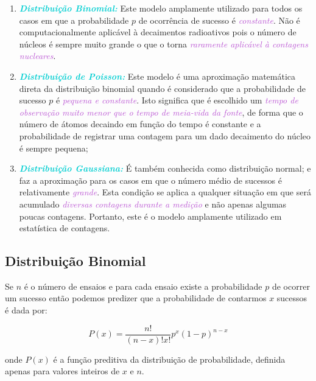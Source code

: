 \documentclass[11pt,a4paper]{article}
\begin{document}
	\begin{enumerate}
		\item \textit{\textbf{\textcolor{DarkTurquoise}{Distribuição Binomial:}}} Este modelo amplamente utilizado para todos os casos em que a probabilidade $p$ de ocorrência de sucesso é \textcolor{MediumOrchid}{\textit{constante}}. Não é computacionalmente aplicável à decaimentos radioativos pois o número de núcleos é sempre muito grande o que o torna \textcolor{MediumOrchid}{\textit{raramente aplicável à contagens nucleares}}.
		
		\item \textit{\textbf{\textcolor{DarkTurquoise}{Distribuição de Poisson:}}} Este modelo é uma aproximação matemática direta da distribuição binomial quando é considerado que a probabilidade de sucesso $p$ é \textcolor{MediumOrchid}{\textit{pequena e constante}}. Isto significa que é escolhido um \textcolor{MediumOrchid}{\textit{tempo de observação muito menor que o tempo de meia-vida da fonte}}, de forma que o número de átomos decaindo em função do tempo é constante e a probabilidade de registrar uma contagem para um dado decaimento do núcleo é sempre pequena;
		
		\item \textit{\textbf{\textcolor{DarkTurquoise}{Distribuição Gaussiana:}}} É também conhecida como distribuição normal; e faz a aproximação para os casos em que o número médio de sucessos é relativamente \textcolor{MediumOrchid}{\textit{grande}}. Esta condição se aplica a qualquer situação em que será acumulado \textcolor{MediumOrchid}{\textit{diversas contagens durante a medição}} e não apenas algumas poucas contagens. Portanto, este é o modelo amplamente utilizado em estatística de contagens.		
	\end{enumerate}

	\subsection*{Distribuição Binomial}

		Se $n$ é o número de ensaios e para cada ensaio existe a probabilidade $p$ de ocorrer um sucesso então podemos predizer que a probabilidade de contarmos $x$ sucessos é dada por:

			\begin{equation}
				P(x) = \frac{n!}{(n - x)! x!} p^x (1 - p)^{n - x}
			\end{equation}

		\noindent onde $P(x)$ é a função preditiva da distribuição de probabilidade, definida apenas para valores inteiros de $x$ e $n$. 
\end{document}
